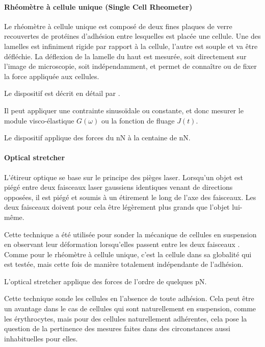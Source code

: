 \documentclass{report}
\begin{document}
\paragraph{Rhéomètre à cellule unique (Single Cell Rheometer)}

Le rhéomètre à cellule unique est composé de deux fines plaques de verre recouvertes de protéines d'adhésion entre lesquelles est placée une cellule. Une des lamelles est infiniment rigide par rapport à la cellule, l'autre est souple et va être défléchie. 
La déflexion de la lamelle du haut est mesurée, soit directement sur l'image de microscopie, soit indépendamment, et permet de connaître ou de fixer la force appliquée aux cellules. 

Le dispositif est décrit en détail par \cite{buffi}. 




Il peut appliquer une contrainte sinusoïdale ou constante, et donc mesurer le module visco-élastique $G(\omega)$ ou la fonction de fluage $J(t)$. 

Le dispositif applique des forces du nN à la centaine de nN.



\paragraph{Optical stretcher}

L'étireur optique se base sur le principe des pièges laser.
Lorsqu'un objet est piégé entre deux faisceaux laser gaussiens identiques venant de directions opposées, il est piégé et soumis à un étirement le long de l'axe des faisceaux. 
Les deux faisceaux doivent pour cela être légèrement plus grands que l'objet lui-même. 

Cette technique a été utilisée pour sonder la mécanique de cellules en suspension en observant leur déformation lorsqu'elles passent entre les deux faisceaux \cite{guck}. 
Comme pour le rhéomètre à cellule unique, c'est la cellule dans sa globalité qui est testée, mais cette fois de manière totalement indépendante de l'adhésion. 

L'optical stretcher applique des forces de l'ordre de quelques pN. 

Cette technique sonde les cellules en l'absence de toute adhésion. Cela peut être un avantage dans le cas de cellules qui sont naturellement en suspension, comme les érythrocytes, mais pour des cellules naturellement adhérentes, cela pose la question de la pertinence des mesures faites dans des circonstances aussi inhabituelles pour elles. 
\end{document}
